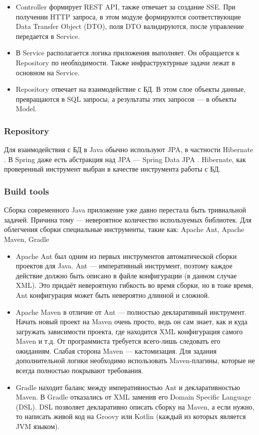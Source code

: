 \begin{itemize}
    \item Controller формирует REST API, также отвечает за создание SSE.
          При получении HTTP запроса, в этом модуле формируются соответствующие Data Transfer Object (DTO),
          поля DTO валидируются, после управление передается в Service.
    \item В Service располагается логика приложения выполняет.
          Он обращается к Repository по необходимости. Также инфраструктурные задачи лежат в основном на Service.
    \item Repository отвечает на взаимодействие с БД.
          В этом слое объекты данные, превращаются в SQL запросы, а результаты этих запросов --- в объекты Model.
\end{itemize}

\subsubsection{Repository}
Для взаимодействия с БД в Java обычно используют JPA, в частности Hibernate \cite{HibernateReference}.
В Spring даже есть абстракция над JPA --- Spring Data JPA \cite{SpringDataJPAReference}.
Hibernate, как проверенный инструмент выбран в качестве инструмента работы с БД.


\subsubsection{Build tools}
Сборка современного Java приложение уже давно перестала быть тривиальной задачей.
Причина тому --- невероятное количество используемых библиотек.
Для облегчения сборки специальные инструменты, такие как: Apache Ant, Apache Maven, Gradle

\begin{itemize}
    \item Apache Ant был одним из первых инструментов автоматической сборки проектов для Java.
          Ant --- императивный инструмент, поэтому каждое действие должно быть описано в файле конфигурации (в данном случае XML).
          Это придаёт невероятную гибкость во время сборки, но в тоже время, Ant конфигурация может быть невероятно длинной и сложной.
    \item Apache Maven в отличие от Ant --- полностью декларативный инструмент.
          Начать новый проект на Maven очень просто, ведь он сам знает, как и куда загружать зависимости проекта, где находится XML конфигурация самого Maven и т.д.
          От программиста требуется всего-лишь следовать его ожиданиям.
          Слабая сторона Maven --- кастомизация.
          Для задания дополнительной логики необходимо использовать Maven-плагины, которые не всегда полностью покрывают требования.
    \item Gradle находит баланс между императивностью Ant и декларативностью Maven.
          В Gradle отказались от XML заменив его Domain Specific Language (DSL).
          DSL позволяет декларативно описать сборку на Maven, а если нужно, то написать живой код на Groovy или Kotlin (каждый из которых является JVM языком).
\end{itemize}

